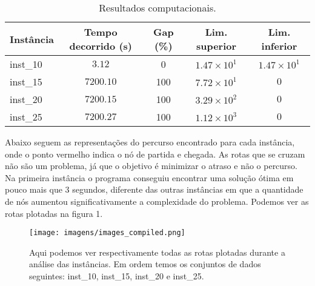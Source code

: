 \documentclass[12pt]{article}
\begin{document}

\begin{table}[h!]
  \begin{center}
    \caption{Resultados computacionais.}
    \label{tab:table1}
    \begin{tabular}{l|c|c|c|c} %
      \textbf{Instância} & \textbf{Tempo decorrido (\si{\second})} & \textbf{Gap (\%)} & \textbf{Lim. superior} & \textbf{Lim. inferior} \\
      \hline
      inst\_10           & $3.12 $                                 & 0                 & $1.47 \times 10^1$     & $1.47 \times 10^1$     \\
      \hline
      inst\_15           & $7200.10 $                              & 100               & $7.72 \times 10^1$     & $0$                    \\
      \hline
      inst\_20           & $7200.15 $                              & 100               & $3.29 \times 10^2$     & $0$                    \\
      \hline
      inst\_25           & $7200.27 $                              & 100               & $1.12 \times 10^3$     & $0$                    \\
      \hline
    \end{tabular}
  \end{center}
\end{table}



Abaixo seguem as representações do percurso encontrado para cada instância, onde o ponto vermelho indica o nó de partida e chegada. As rotas que se cruzam não são um problema, já que o objetivo é minimizar o atraso e não o percurso.
\linebreak
Na primeira instância o programa conseguiu encontrar uma solução ótima em pouco mais que 3 segundos, diferente das outras instâncias em que a quantidade de nós aumentou significativamente a complexidade do problema. Podemos ver as rotas plotadas na figura 1.

\begin{figure}[ht]
  \centering
  \texttt{[image: imagens/images\_compiled.png]}
  \label{graph_inst}
  \caption{Aqui podemos ver respectivamente todas as rotas plotadas durante a análise das instâncias. Em ordem temos os conjuntos de dados seguintes: inst\_10, inst\_15, inst\_20 e inst\_25.}

\end{figure}
\end{document}
